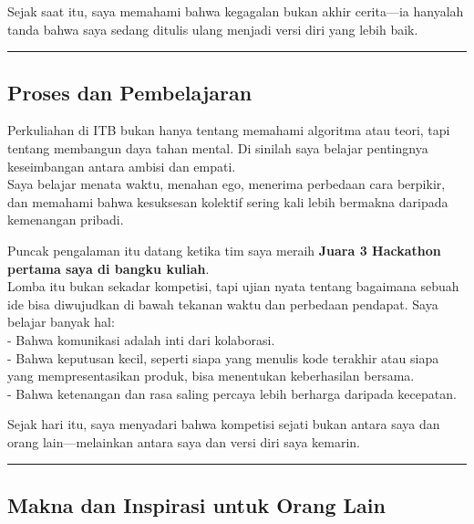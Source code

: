 \documentclass[
  letterpaper,
  DIV=11,
  numbers=noendperiod]{scrreprt}
\begin{document}
Sejak saat itu, saya memahami bahwa kegagalan bukan akhir cerita---ia
hanyalah tanda bahwa saya sedang ditulis ulang menjadi versi diri yang
lebih baik.

\begin{center}\rule{0.5\linewidth}{0.5pt}\end{center}

\subsection{\texorpdfstring{\textbf{Proses dan
Pembelajaran}}{Proses dan Pembelajaran}}\label{proses-dan-pembelajaran}

Perkuliahan di ITB bukan hanya tentang memahami algoritma atau teori,
tapi tentang membangun daya tahan mental. Di sinilah saya belajar
pentingnya keseimbangan antara ambisi dan empati.\\
Saya belajar menata waktu, menahan ego, menerima perbedaan cara
berpikir, dan memahami bahwa kesuksesan kolektif sering kali lebih
bermakna daripada kemenangan pribadi.

Puncak pengalaman itu datang ketika tim saya meraih \textbf{Juara 3
Hackathon pertama saya di bangku kuliah}.\\
Lomba itu bukan sekadar kompetisi, tapi ujian nyata tentang bagaimana
sebuah ide bisa diwujudkan di bawah tekanan waktu dan perbedaan
pendapat. Saya belajar banyak hal:\\
- Bahwa komunikasi adalah inti dari kolaborasi.\\
- Bahwa keputusan kecil, seperti siapa yang menulis kode terakhir atau
siapa yang mempresentasikan produk, bisa menentukan keberhasilan
bersama.\\
- Bahwa ketenangan dan rasa saling percaya lebih berharga daripada
kecepatan.

Sejak hari itu, saya menyadari bahwa kompetisi sejati bukan antara saya
dan orang lain---melainkan antara saya dan versi diri saya kemarin.

\begin{center}\rule{0.5\linewidth}{0.5pt}\end{center}

\subsection{\texorpdfstring{\textbf{Makna dan Inspirasi untuk Orang
Lain}}{Makna dan Inspirasi untuk Orang Lain}}\label{makna-dan-inspirasi-untuk-orang-lain}
\end{document}

